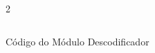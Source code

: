 \begin{figure}[H]
    \centering   
    \begin{tcolorbox}  
        \begin{multicols}{2} 
        \fontsize{9pt}{9pt}\selectfont\inputminted[obeytabs=true,tabsize=4,xleftmargin=20pt,linenos,breaklines]{VHDL}{VHDL/files/decoderHex.vhd}    
        \end{multicols}
    \end{tcolorbox}   
    \caption{Código do Módulo Descodificador}
\end{figure}